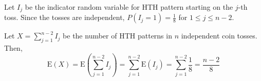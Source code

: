 Let $I_{j}$ be the indicator random variable for HTH pattern starting on the
$j$-th toss. Since the tosses are independent, $P(I_{j}=1) = \frac{1}{8}$ for $1
\leq j \leq n-2$.

Let $X = \sum_{j=1}^{n-2}I_{j}$ be the number of HTH patterns in $n$ independent
coin tosses. Then, $$\text{E}(X) = \text{E}(\sum_{j=1}^{n-2}I_{j}) = \sum_{j=1}^
{n-2}\text{E}(I_{j}) = \sum_{j=1}^{n-2}\frac{1}{8} = \frac{n-2}{8}$$